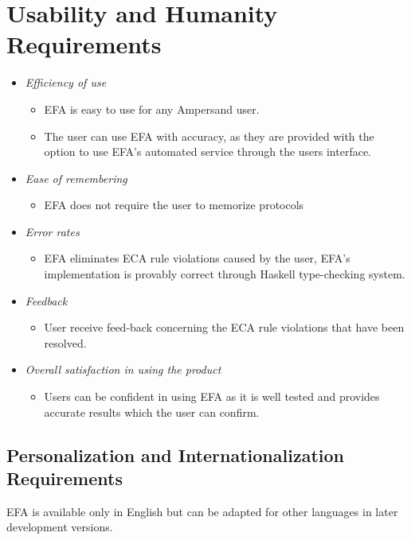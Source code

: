 \section{Usability and Humanity Requirements}\label{sec:Usability}

\begin{itemize}
    \item \textit{Efficiency of use} 
        \begin{itemize}
           \item EFA is easy to use for any Ampersand user.
           \item The user can use EFA with accuracy, as they are provided with 
           the option to use EFA's automated service through the users 
           interface.
        \end{itemize}
    \item \textit{Ease of remembering}  
        \begin{itemize}
            \item EFA does not require the user to memorize protocols
        \end{itemize}
    \item \textit{Error rates} 
        \begin{itemize}
            \item EFA eliminates ECA rule violations caused by the user, 
            EFA's implementation is provably correct through Haskell 
            type-checking system.
        \end{itemize}
       
    \item \textit{Feedback} 
        \begin{itemize}
            \item User receive feed-back concerning the ECA rule 
            violations that have been resolved.
        \end{itemize}
    \item \textit{Overall satisfaction in using the product} 
    \begin{itemize}
        \item Users can be confident in using EFA as it is well tested and 
        provides accurate results which the user can confirm.
    \end{itemize}
\end{itemize}

\subsection{Personalization and Internationalization 
Requirements}\label{subsec:Personalization}
EFA is available only in English but can be adapted for other languages in 
later development versions.

